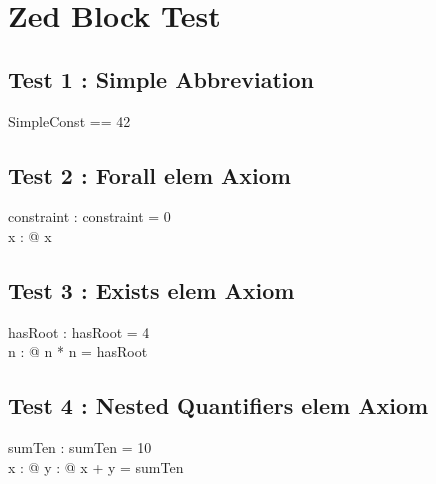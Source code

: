 \documentclass[a4paper,10pt,fleqn]{article}
\begin{document}
\section*{Zed Block Test}

\subsection*{Test 1 : Simple Abbreviation}

\begin{zed}
SimpleConst == 42
\end{zed}

\subsection*{Test 2 : Forall elem Axiom}

\begin{axdef}
constraint : \nat
\where
constraint = 0 \\
\forall x : \nat @ x 
\end{axdef}

\subsection*{Test 3 : Exists elem Axiom}

\begin{axdef}
hasRoot : \nat
\where
hasRoot = 4 \\
\exists n : \nat @ n * n = hasRoot
\end{axdef}

\subsection*{Test 4 : Nested Quantifiers elem Axiom}

\begin{axdef}
sumTen : \nat
\where
sumTen = 10 \\
\forall x : \nat @ \exists y : \nat @ x + y = sumTen
\end{axdef}
\end{document}
